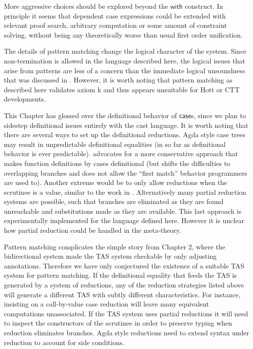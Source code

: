 More aggressive choices should be explored beyond the $\mathsf{with}$ construct.
In principle it seems that dependent case expressions could be extended with relevant proof search, arbitrary computation or some amount of constraint solving, without being any theoretically worse than usual first order unification. 



The details of pattern matching change the logical character of the system\cite{cockx_devriese_2018}.
Since non-termination is allowed in the language described here, the logical issues that arise from patterns are less of a concern than the immediate logical unsoundness that was discussed in .
However, it is worth noting that pattern matching as described here validates axiom k and thus appears unsuitable for Hott or CTT developments.

This Chapter has glossed over the definitional behavior of $\mathsf{case}$s, since we plan to sidestep definitional issues entirely with the cast language.
It is worth noting that there are several ways to set up the definitional reductions.
Agda style case trees may result in unpredictable definitional equalities (in so far as definitional behavior is ever predictable).
\cite{10.1007/978-3-642-54833-8_6} advocates for a more conservative approach that makes function definitions by cases definitional (but shifts the difficulties to overlapping branches and does not allow the ``first match'' behavior programmers are used to).
Another extreme would be to only allow reductions when the scrutinee is a value, similar to the work in \cite{sjoberg2012irrelevance}.
Alternatively many partial reduction systems are possible, such that branches are eliminated as they are found unreachable and substitutions made as they are available.
This last approach is experimentally implemented for the language defined here.
However it is unclear how partial reduction could be handled in the meta-theory.

Pattern matching complicates the simple story from Chapter 2, where the bidirectional system made the TAS system checkable by only adjusting annotations.
Therefore we have only conjectured the existence of a suitable TAS system for pattern matching.
If the definitional equality that feeds the TAS is generated by a system of reductions, any of the reduction strategies listed above will generate a different TAS with subtly different characteristics.
For instance, insisting on a call-by-value case reduction will leave many equivalent computations unassociated.
If the TAS system uses partial reductions it will need to inspect the constructors of the scrutinee in order to preserve typing when reduction eliminates branches.
Agda style reductions need to extend syntax under reduction to account for side conditions. 

